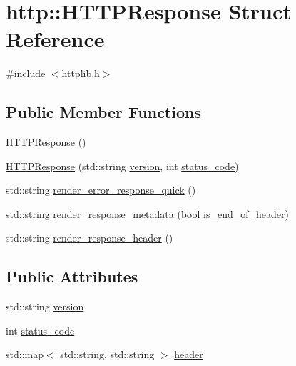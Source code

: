 \hypertarget{structhttp_1_1HTTPResponse}{}\section{http\+:\+:H\+T\+T\+P\+Response Struct Reference}
\label{structhttp_1_1HTTPResponse}


{\ttfamily \#include $<$httplib.\+h$>$}

\subsection*{Public Member Functions}
\begin{DoxyCompactItemize}
\item 
\hyperlink{structhttp_1_1HTTPResponse_a3efdc24565a5c18b88ac6b64b1706c35}{H\+T\+T\+P\+Response} ()
\item 
\hyperlink{structhttp_1_1HTTPResponse_adf8fc64bf83e9ec40468d9a522ee6043}{H\+T\+T\+P\+Response} (std\+::string \hyperlink{structhttp_1_1HTTPResponse_a777b248557b9b4d7ea708903d32a6f65}{version}, int \hyperlink{structhttp_1_1HTTPResponse_a5857363345f576492ec4d7d1cd581433}{status\+\_\+code})
\item 
std\+::string \hyperlink{structhttp_1_1HTTPResponse_a16bac881dfef67c0b687c1d8f87aa03c}{render\+\_\+error\+\_\+response\+\_\+quick} ()
\item 
std\+::string \hyperlink{structhttp_1_1HTTPResponse_a23c39df4ae7668b776d562107684f0a6}{render\+\_\+response\+\_\+metadata} (bool is\+\_\+end\+\_\+of\+\_\+header)
\item 
std\+::string \hyperlink{structhttp_1_1HTTPResponse_a7295bb0911519867fd26b8bc7a481978}{render\+\_\+response\+\_\+header} ()
\end{DoxyCompactItemize}
\subsection*{Public Attributes}
\begin{DoxyCompactItemize}
\item 
std\+::string \hyperlink{structhttp_1_1HTTPResponse_a777b248557b9b4d7ea708903d32a6f65}{version}
\item 
int \hyperlink{structhttp_1_1HTTPResponse_a5857363345f576492ec4d7d1cd581433}{status\+\_\+code}
\item 
std\+::map$<$ std\+::string, std\+::string $>$ \hyperlink{structhttp_1_1HTTPResponse_a76f5d56ced92e1152ca471dabb68d79f}{header}
\end{DoxyCompactItemize}


